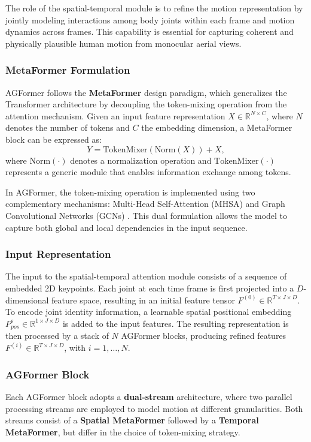 The role of the spatial-temporal module is to refine the motion representation by jointly modeling interactions among body joints within each frame and motion 
dynamics across frames.
This capability is essential for capturing coherent and physically plausible human motion from monocular aerial views.

\subsubsection{MetaFormer Formulation}
AGFormer follows the \textbf{MetaFormer} \cite{yu2022metaformer} design paradigm, which generalizes the Transformer architecture \cite{vaswani2017attention} by decoupling the token-mixing operation 
from the attention mechanism.
Given an input feature representation \( X \in \mathbb{R}^{N \times C} \), where \( N \) denotes the number of tokens and \( C \) the embedding dimension, a MetaFormer 
block can be expressed as:
\begin{equation}
    Y = \text{TokenMixer}(\text{Norm}(X)) + X,
\end{equation}
where \( \text{Norm}(\cdot) \) denotes a normalization operation and \( \text{TokenMixer}(\cdot) \) represents a generic module that enables information exchange among 
tokens.

In AGFormer, the token-mixing operation is implemented using two complementary mechanisms: Multi-Head Self-Attention (MHSA) and Graph Convolutional Networks (GCNs) \cite{kipf2016semi}.
This dual formulation allows the model to capture both global and local dependencies in the input sequence.

\subsubsection{Input Representation}
The input to the spatial-temporal attention module consists of a sequence of embedded 2D keypoints.
Each joint at each time frame is first projected into a \( D \)-dimensional feature space, resulting in an initial feature tensor $F^{(0)} \in \mathbb{R}^{T \times J \times D}$.
To encode joint identity information, a learnable spatial positional embedding \( P^{s}_{pos} \in \mathbb{R}^{1 \times J \times D} \) is added to the input features.
The resulting representation is then processed by a stack of \( N \) AGFormer blocks, producing refined features \( F^{(i)} \in \mathbb{R}^{T \times J \times D} \), with \( i = 1, \dots, N \).

\subsubsection{AGFormer Block}
Each AGFormer block adopts a \textbf{dual-stream} architecture, where two parallel processing streams are employed to model motion at different granularities.
Both streams consist of a \textbf{Spatial MetaFormer} followed by a \textbf{Temporal MetaFormer}, but differ in the choice of token-mixing strategy.

